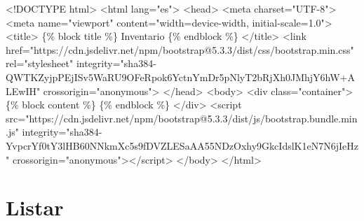 \documentclass[
  a4paper,
  DIV=11,
  numbers=noendperiod,
  onepage,
  openany]{scrreprt}
\newenvironment{Shaded}{\begin{snugshade}}{\end{snugshade}}
\newcommand{\DataTypeTok}[1]{\textcolor[rgb]{0.68,0.00,0.00}{#1}}
\newcommand{\KeywordTok}[1]{\textcolor[rgb]{0.00,0.23,0.31}{#1}}
\newcommand{\NormalTok}[1]{\textcolor[rgb]{0.00,0.23,0.31}{#1}}
\newcommand{\OperatorTok}[1]{\textcolor[rgb]{0.37,0.37,0.37}{#1}}
\newcommand{\OtherTok}[1]{\textcolor[rgb]{0.00,0.23,0.31}{#1}}
\newcommand{\StringTok}[1]{\textcolor[rgb]{0.13,0.47,0.30}{#1}}
\begin{document}
\begin{Shaded}
\begin{Highlighting}[]
\DataTypeTok{\textless{}!DOCTYPE }\NormalTok{html}\DataTypeTok{\textgreater{}}
\DataTypeTok{\textless{}}\KeywordTok{html}\OtherTok{ lang}\OperatorTok{=}\StringTok{"es"}\DataTypeTok{\textgreater{}}
\DataTypeTok{\textless{}}\KeywordTok{head}\DataTypeTok{\textgreater{}}
    \DataTypeTok{\textless{}}\KeywordTok{meta}\OtherTok{ charset}\OperatorTok{=}\StringTok{"UTF{-}8"}\DataTypeTok{\textgreater{}}
    \DataTypeTok{\textless{}}\KeywordTok{meta}\OtherTok{ name}\OperatorTok{=}\StringTok{"viewport"}\OtherTok{ content}\OperatorTok{=}\StringTok{"width=device{-}width, initial{-}scale=1.0"}\DataTypeTok{\textgreater{}}
    \DataTypeTok{\textless{}}\KeywordTok{title}\DataTypeTok{\textgreater{}}
\NormalTok{        \{\% block title \%\}}
\NormalTok{        Inventario}
\NormalTok{        \{\% endblock \%\}}
    \DataTypeTok{\textless{}/}\KeywordTok{title}\DataTypeTok{\textgreater{}}
    \DataTypeTok{\textless{}}\KeywordTok{link}\OtherTok{ href}\OperatorTok{=}\StringTok{"https://cdn.jsdelivr.net/npm/bootstrap@5.3.3/dist/css/bootstrap.min.css"}\OtherTok{ rel}\OperatorTok{=}\StringTok{"stylesheet"}\OtherTok{ integrity}\OperatorTok{=}\StringTok{"sha384{-}QWTKZyjpPEjISv5WaRU9OFeRpok6YctnYmDr5pNlyT2bRjXh0JMhjY6hW+ALEwIH"}\OtherTok{ crossorigin}\OperatorTok{=}\StringTok{"anonymous"}\DataTypeTok{\textgreater{}}
\DataTypeTok{\textless{}/}\KeywordTok{head}\DataTypeTok{\textgreater{}}
\DataTypeTok{\textless{}}\KeywordTok{body}\DataTypeTok{\textgreater{}}
    \DataTypeTok{\textless{}}\KeywordTok{div}\OtherTok{ class}\OperatorTok{=}\StringTok{"container"}\DataTypeTok{\textgreater{}}
\NormalTok{        \{\% block content \%\} }
\NormalTok{        \{\% endblock \%\}}
    \DataTypeTok{\textless{}/}\KeywordTok{div}\DataTypeTok{\textgreater{}}
\DataTypeTok{\textless{}}\KeywordTok{script}\OtherTok{ src}\OperatorTok{=}\StringTok{"https://cdn.jsdelivr.net/npm/bootstrap@5.3.3/dist/js/bootstrap.bundle.min.js"}\OtherTok{ integrity}\OperatorTok{=}\StringTok{"sha384{-}YvpcrYf0tY3lHB60NNkmXc5s9fDVZLESaAA55NDzOxhy9GkcIdslK1eN7N6jIeHz"}\OtherTok{ crossorigin}\OperatorTok{=}\StringTok{"anonymous"}\DataTypeTok{\textgreater{}\textless{}/}\KeywordTok{script}\DataTypeTok{\textgreater{}}
\DataTypeTok{\textless{}/}\KeywordTok{body}\DataTypeTok{\textgreater{}}
\DataTypeTok{\textless{}/}\KeywordTok{html}\DataTypeTok{\textgreater{}}
\end{Highlighting}
\end{Shaded}

\section{Listar}\label{listar}
\end{document}
